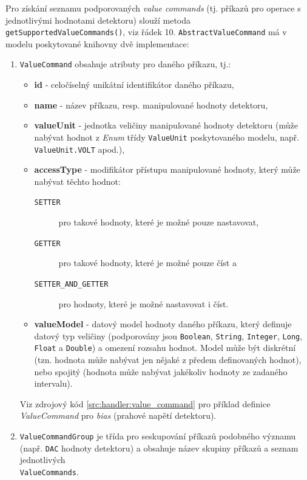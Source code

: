 Pro získání seznamu podporovaných \textit{value commands} (tj. příkazů pro operace s jednotlivými hodnotami detektoru) slouží metoda \texttt{getSupportedValueCommands()}, viz řádek 10. \texttt{AbstractValueCommand} má v modelu poskytované knihovny dvě implementace:
\begin{enumerate}[label=(\roman*)]
	\item \texttt{ValueCommand} obsahuje atributy pro daného příkazu, tj.:
	\begin{itemize}
		\item \textbf{id} - celočíselný unikátní identifikátor daného příkazu,
		\item \textbf{name} - název příkazu, resp. manipulované hodnoty detektoru,
		\item \textbf{valueUnit} - jednotka veličiny manipulované hodnoty detektoru (může nabývat hodnot z \textit{Enum} třídy \texttt{ValueUnit} poskytovaného modelu, např. \texttt{ValueUnit.VOLT} apod.),
		\item \textbf{accessType} - modifikátor přístupu manipulované hodnoty, který může nabývat těchto hodnot:
		\begin{description}
			\item[\texttt{SETTER}] pro takové hodnoty, které je možné pouze nastavovat,
			\item[\texttt{GETTER}] pro takové hodnoty, které je možné pouze číst a
			\item[\texttt{SETTER\_AND\_GETTER}] pro hodnoty, které je možné nastavovat i číst.
		\end{description}
		\item \textbf{valueModel} - datový model hodnoty daného příkazu, který definuje datový typ veličiny (podporovány jsou \texttt{Boolean}, \texttt{String}, \texttt{Integer}, \texttt{Long}, \texttt{Float} a \texttt{Double}) a omezení rozsahu hodnot. Model může být diskrétní (tzn. hodnota může nabývat jen nějaké z předem definovaných hodnot), nebo spojitý (hodnota může nabývat jakékoliv hodnoty ze zadaného intervalu).
	\end{itemize}
	Viz zdrojový kód \ref{src:handler:value_command} pro příklad definice \textit{ValueCommand} pro \textit{bias} (prahové napětí detektoru).

	\item \texttt{ValueCommandGroup} je třída pro seskupování příkazů podobného významu (např. \texttt{DAC} hodnoty detektoru) a obsahuje název skupiny příkazů a seznam jednotlivých\\\texttt{ValueCommands}.
\end{enumerate}

